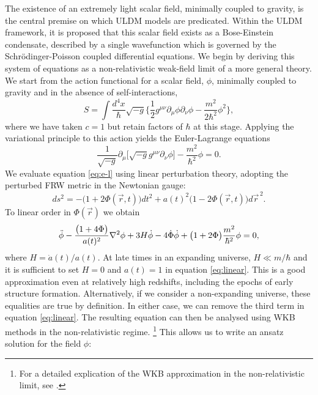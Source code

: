 \documentclass[a4paper,11pt]{article}
\begin{document}
The existence of an extremely light scalar field, minimally coupled to gravity, is the central premise on which ULDM models are predicated. Within the ULDM framework, it is proposed that this scalar field exists as a Bose-Einstein condensate, described by a single wavefunction which is governed by the Schr{\"o}dinger-Poisson coupled differential equations. We begin by deriving this system of equations as a non-relativistic weak-field limit of a more general theory. We start from the action functional for a scalar field, $\phi$, minimally coupled to gravity and in the absence of self-interactions,
%
\begin{equation}\label{eq:action}
    S=\int \frac{d^4x}{\hbar}\sqrt{-g}\bigg\{\frac{1}{2}g^{\mu\nu}\partial_\mu\phi\partial_\nu\phi-\frac{m^2}{2\hbar^2}\phi^2\bigg\},
\end{equation}
%
where we have taken $c=1$ but retain factors of $\hbar$ at this stage. Applying the variational principle to this action yields the Euler-Lagrange equations
%
\begin{equation}\label{eq:e-l}
    \frac{1}{\sqrt{-g}}\partial_\mu\big[\sqrt{-g}g^{\mu\nu}\partial_\nu\phi\big]-\frac{m^2}{\hbar^2}\phi=0.
\end{equation}
We evaluate equation \ref{eq:e-l} using linear perturbation theory, adopting the perturbed FRW metric in the Newtonian gauge:
\begin{equation}\label{eq:pFRW}
    ds^2=-\big(1+2\Phi(\vec{r},t)\big)dt^2+a(t)^2\big(1-2\Phi(\vec{r},t)\big)d\vec{r}^{\,2}.
\end{equation}
To linear order in $\Phi(\vec{r})$ we obtain 
\begin{equation}\label{eq:linear}
    \Ddot{\phi}-\frac{\big(1+4\Phi\big)}{a(t)^2}\nabla^2\phi+3H\Dot{\phi}-4\dot{\Phi}\dot{\phi}+\big(1+2\Phi\big)\frac{m^2}{\hbar^2}\phi=0,
\end{equation}
where $H=\Dot{a}(t)/a(t)$. At late times in an expanding universe, $H\ll m/\hbar$ and it is sufficient to set $H=0$ and $a(t)=1$ in equation \ref{eq:linear}. This is a good approximation even at relatively high redshifts, including the epochs of early structure formation. Alternatively, if we consider a non-expanding universe, these equalities are true by definition. In either case, we can remove the third term in equation \ref{eq:linear}. The resulting equation can then be analysed using WKB methods in the non-relativistic regime. \footnote{For a detailed explication of the WKB approximation in the non-relativistic limit, see \cite{Young2015}.} This allows us to write an ansatz solution for the field $\phi$:
\end{document}
